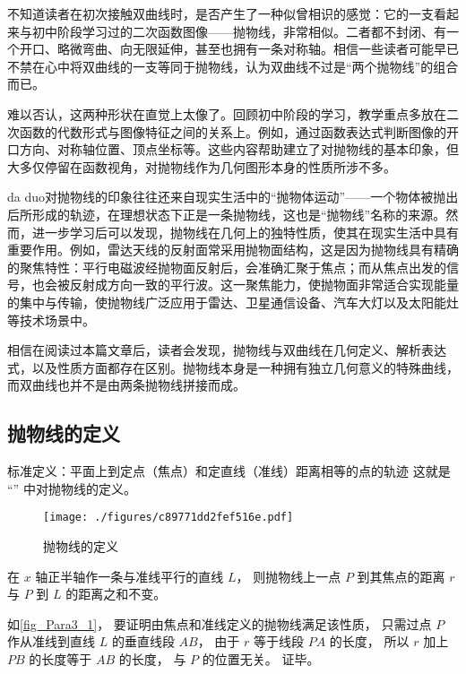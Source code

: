 
\begin{issues}
\issueDraft
\end{issues}


不知道读者在初次接触双曲线时，是否产生了一种似曾相识的感觉：它的一支看起来与初中阶段学习过的二次函数图像——抛物线，非常相似。二者都不封闭、有一个开口、略微弯曲、向无限延伸，甚至也拥有一条对称轴。相信一些读者可能早已不禁在心中将双曲线的一支等同于抛物线，认为双曲线不过是“两个抛物线”的组合而已。

难以否认，这两种形状在直觉上太像了。回顾初中阶段的学习，教学重点多放在二次函数的代数形式与图像特征之间的关系上。例如，通过函数表达式判断图像的开口方向、对称轴位置、顶点坐标等。这些内容帮助建立了对抛物线的基本印象，但大多仅停留在函数视角，对抛物线作为几何图形本身的性质所涉不多。

da duo对抛物线的印象往往还来自现实生活中的“抛物体运动”——一个物体被抛出后所形成的轨迹，在理想状态下正是一条抛物线，这也是“抛物线”名称的来源。然而，进一步学习后可以发现，抛物线在几何上的独特性质，使其在现实生活中具有重要作用。例如，雷达天线的反射面常采用抛物面结构，这是因为抛物线具有精确的聚焦特性：平行电磁波经抛物面反射后，会准确汇聚于焦点；而从焦点出发的信号，也会被反射成方向一致的平行波。这一聚焦能力，使抛物面非常适合实现能量的集中与传输，使抛物线广泛应用于雷达、卫星通信设备、汽车大灯以及太阳能灶等技术场景中。

相信在阅读过本篇文章后，读者会发现，抛物线与双曲线在几何定义、解析表达式，以及性质方面都存在区别。抛物线本身是一种拥有独立几何意义的特殊曲线，而双曲线也并不是由两条抛物线拼接而成。

\subsection{抛物线的定义}
标准定义：平面上到定点（焦点）和定直线（准线）距离相等的点的轨迹
这就是 “” 中对抛物线的定义。
\begin{figure}[ht]
\centering
\texttt{[image: ./figures/c89771dd2fef516e.pdf]}
\caption{抛物线的定义} \label{fig_Para3_1}
\end{figure}

在 $x$ 轴正半轴作一条与准线平行的直线 $L$， 则抛物线上一点 $P$ 到其焦点的距离 $r$ 与 $P$ 到 $L$ 的距离之和不变。

如\autoref{fig_Para3_1}， 要证明由焦点和准线定义的抛物线满足该性质， 只需过点 $P$ 作从准线到直线 $L$ 的垂直线段 $AB$， 由于 $r$ 等于线段 $PA$ 的长度， 所以 $r$ 加上 $PB$ 的长度等于 $AB$ 的长度， 与 $P$ 的位置无关。 证毕。


